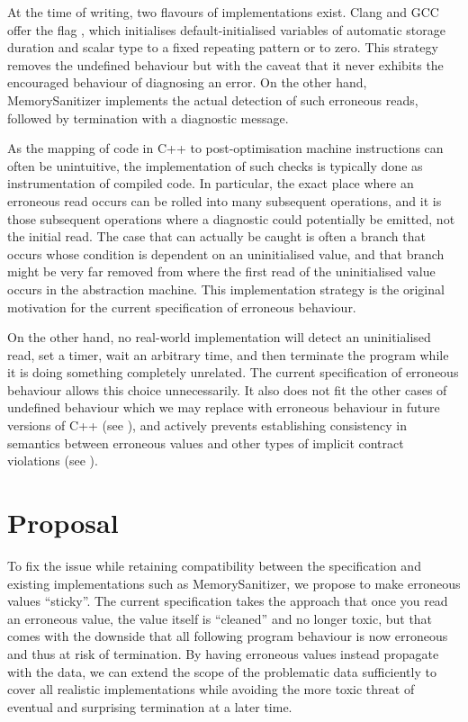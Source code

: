 At the time of writing, two flavours of \cite{P2795R5} implementations exist. Clang and GCC offer the flag \mbox{}, which initialises default-initialised variables of automatic storage duration and scalar type to a fixed repeating pattern or to zero. This strategy removes the undefined behaviour but with the caveat that it never exhibits the encouraged behaviour of diagnosing an error. On the other hand, MemorySanitizer implements the actual detection of such erroneous reads, followed by termination with a diagnostic message.

As the mapping of code in C++ to  post-optimisation machine instructions can often be unintuitive, the implementation  of such checks is typically done as instrumentation of compiled code.  In particular, the exact place where an erroneous read occurs can be rolled into many subsequent operations, and it is those subsequent operations where a diagnostic could potentially be emitted, not the initial read.  The case that can actually be caught is often a branch that occurs whose condition is dependent on an uninitialised value, and that branch might be very far removed from where the first read of the uninitialised value occurs in the abstraction machine. This implementation strategy is the original motivation for the current specification of erroneous behaviour.

On the other hand, no real-world implementation will detect an uninitialised read, set a timer, wait an arbitrary time, and then terminate the program while it is doing something completely unrelated.  The current specification of erroneous behaviour allows this choice unnecessarily. It also does not fit the other cases of undefined behaviour which we may replace with erroneous behaviour in future versions of C++ (see \cite{P3100R4}), and actively prevents establishing consistency in semantics between erroneous values and other types of implicit contract violations (see \cite{P3229R0}).

\section{Proposal}

To fix the issue while retaining compatibility between the specification and existing implementations such as MemorySanitizer, we propose to make erroneous values ``sticky''.  The current specification takes the approach that once you read an erroneous value, the value itself is ``cleaned'' and no longer toxic, but that comes with the downside that all following program behaviour is now erroneous and thus at risk of termination. By having erroneous values instead propagate with the data, we can extend the scope of the problematic data sufficiently to cover all realistic implementations while avoiding the more toxic threat of eventual and surprising termination at a later time.

